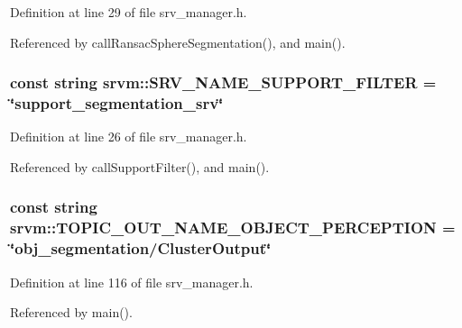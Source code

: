 Definition at line 29 of file srv\-\_\-manager.\-h.



Referenced by call\-Ransac\-Sphere\-Segmentation(), and main().

\hypertarget{namespacesrvm_a326e9454009b64e7e5bac20f050ff129}{
\subsubsection[{S\-R\-V\-\_\-\-N\-A\-M\-E\-\_\-\-S\-U\-P\-P\-O\-R\-T\-\_\-\-F\-I\-L\-T\-E\-R}]{\setlength{\rightskip}{0pt plus 5cm}const string srvm\-::\-S\-R\-V\-\_\-\-N\-A\-M\-E\-\_\-\-S\-U\-P\-P\-O\-R\-T\-\_\-\-F\-I\-L\-T\-E\-R = \char`\"{}support\-\_\-segmentation\-\_\-srv\char`\"{}}}\label{namespacesrvm_a326e9454009b64e7e5bac20f050ff129}


Definition at line 26 of file srv\-\_\-manager.\-h.



Referenced by call\-Support\-Filter(), and main().

\hypertarget{namespacesrvm_a520b8813dc65ba764d59f05a0b316e5c}{
\subsubsection[{T\-O\-P\-I\-C\-\_\-\-O\-U\-T\-\_\-\-N\-A\-M\-E\-\_\-\-O\-B\-J\-E\-C\-T\-\_\-\-P\-E\-R\-C\-E\-P\-T\-I\-O\-N}]{\setlength{\rightskip}{0pt plus 5cm}const string srvm\-::\-T\-O\-P\-I\-C\-\_\-\-O\-U\-T\-\_\-\-N\-A\-M\-E\-\_\-\-O\-B\-J\-E\-C\-T\-\_\-\-P\-E\-R\-C\-E\-P\-T\-I\-O\-N = \char`\"{}obj\-\_\-segmentation/Cluster\-Output\char`\"{}}}\label{namespacesrvm_a520b8813dc65ba764d59f05a0b316e5c}


Definition at line 116 of file srv\-\_\-manager.\-h.



Referenced by main().


